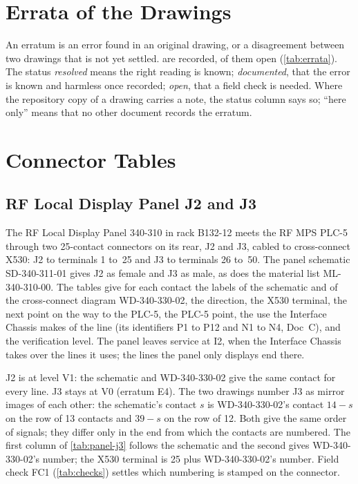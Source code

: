 



\section{Errata of the Drawings}\label{sec:errata}

An erratum is an error found in an original drawing, or a disagreement between two
drawings that is not yet settled. \WErrata{} are recorded, \WErrataOpen{} of them open
(\cref{tab:errata}). The status \emph{resolved} means the right reading is known;
\emph{documented}, that the error is known and harmless once recorded; \emph{open},
that a field check is needed. Where the repository copy of a drawing carries a note,
the status column says so; ``here only'' means that no other document records the
erratum.



\section{Connector Tables}\label{sec:connections}

\subsection{RF Local Display Panel J2 and J3}\label{sec:panel-pins}

The RF Local Display Panel 340-310 in rack B132-12 meets the RF MPS PLC-5 through two
25-contact connectors on its rear, J2 and J3, cabled to cross-connect X530: J2 to
terminals 1 to~25 and J3 to terminals 26 to~50. The panel schematic SD-340-311-01
gives J2 as female and J3 as male, as does the material list ML-340-310-00. The
tables give for each contact the labels of the schematic and of the cross-connect
diagram WD-340-330-02, the direction, the X530 terminal, the next point on the way to
the PLC-5, the PLC-5 point, the use the Interface Chassis makes of the line (its
identifiers P1 to P12 and N1 to N4, Doc~C), and the verification level. The panel
leaves service at I2, when the Interface Chassis takes over the lines it uses; the
lines the panel only displays end there.



J2 is at level V1: the schematic and WD-340-330-02 give the same contact for every
line. J3 stays at V0 (erratum E4). The two drawings number J3 as mirror images of
each other: the schematic's contact $s$ is WD-340-330-02's contact $14-s$ on the row
of 13 contacts and $39-s$ on the row of 12. Both give the same order of signals; they
differ only in the end from which the contacts are numbered. The first column of
\cref{tab:panel-j3} follows the schematic and the second gives WD-340-330-02's
number; the X530 terminal is 25 plus WD-340-330-02's number. Field check FC1
(\cref{tab:checks}) settles which numbering is stamped on the connector.

